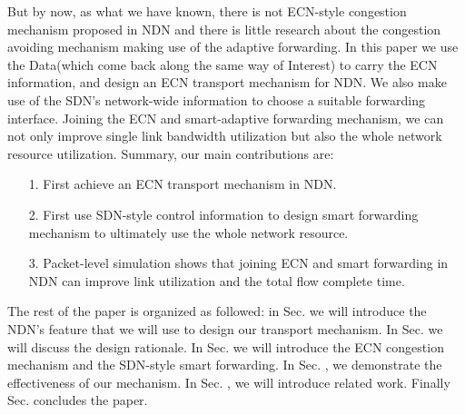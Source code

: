 But by now, as what we have known, there is not ECN-style congestion mechanism proposed in NDN and there is little research about the congestion avoiding mechanism making use of the adaptive forwarding. In this paper we use the Data(which come back along the same way of Interest) to carry the ECN information, and design an ECN transport mechanism for NDN. We also make use of the SDN's network-wide information to choose a suitable forwarding interface\cite{SDN}. Joining the ECN and smart-adaptive forwarding mechanism, we can not only improve single link bandwidth utilization but also the whole network resource utilization. Summary, our main contributions are:
\begin{enumerate}
\item[1.]First achieve an ECN transport mechanism in NDN.

\item[2.]First use SDN-style control information to design smart forwarding mechanism to ultimately use the whole network resource.

\item[3.] Packet-level simulation shows that joining ECN and smart forwarding in NDN can improve link utilization and the total flow complete time.
\end{enumerate}
The rest of the paper is organized as followed: in Sec. \uppercase\expandafter{} we will introduce the NDN's feature that we will use to design our transport mechanism. In Sec. \uppercase\expandafter{} we will discuss the design rationale. In Sec. \uppercase\expandafter{} we will introduce the ECN congestion mechanism and the SDN-style smart forwarding. In Sec. \uppercase\expandafter{}, we demonstrate the effectiveness of our mechanism. In Sec. \uppercase\expandafter{}, we will introduce related work. Finally Sec. \uppercase\expandafter{} concludes the paper.


